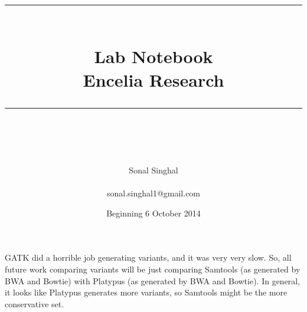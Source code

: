 \documentclass[idxtotoc,hyperref,openany,oneside]{labbook} %
\newcommand{\HRule}{\rule{\linewidth}{0.5mm}} %
\begin{document}

\frontmatter %
\title{
\begin{center}
\HRule \\[0.4cm]
{\Huge \bfseries Lab Notebook \\[0.5cm] \Large Encelia Research}\\[0.4cm] %
\HRule \\[1.5cm]
\end{center}
}
\author{\Huge Sonal Singhal \\ \\ \LARGE sonal.singhal1@gmail.com \\[2cm]} %
\date{Beginning 6 October 2014} %
\maketitle

\tableofcontents

\mainmatter %











GATK did a horrible job generating variants, and it was very very slow. So, all future work comparing variants will be just comparing Samtools (as generated by BWA and Bowtie) with Platypus (as generated by BWA and Bowtie). In general, it looks like Platypus generates more variants, so Samtools might be the more conservative set. \\
\end{document}
